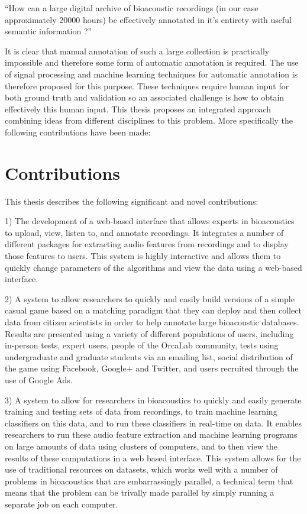 \documentclass[12pt,oneside]{book}
\begin{document}
``How can a large digital archive of bioacoustic recordings (in our
case approximately 20000 hours) be effectively annotated in it's
entirety with useful semantic information ?''

It is clear that manual annotation of such a large collection is
practically impossible and therefore some form of automatic annotation
is required. The use of signal processing and machine learning
techniques for automatic annotation is therefore proposed for this
purpose. These techniques require human input for both ground truth
and validation so an associated challenge is how to obtain effectively
this human input. This thesis proposes an integrated approach combining
ideas from different disciplines to this problem. More specifically
the following contributions have been made:

\section{Contributions}

This thesis describes the following significant and novel
contributions:

1) The development of a web-based interface that allows experts in
bioacoustics to upload, view, listen to, and annotate recordings.  It
integrates a number of different packages for extracting audio
features from recordings and to display those features to users.  This
system is highly interactive and allows them to quickly change
parameters of the algorithms and view the data using a web-based
interface.

2) A system to allow researchers to quickly and easily build versions
of a simple casual game based on a matching paradigm that they can
deploy and then collect data from citizen scientists in order to help
annotate large bioacoustic databases.  Results are presented using a
variety of different populations of users, including in-person tests,
expert users, people of the OrcaLab community, tests using
undergraduate and graduate students via an emailing list, social
distribution of the game using Facebook, Google+ and Twitter, and
users recruited through the use of Google Ads.

3) A system to allow for researchers in bioacoustics to quickly and
easily generate training and testing sets of data from recordings, to
train machine learning classifiers on this data, and to run these
classifiers in real-time on data.  It enables researchers to run these
audio feature extraction and machine learning programs on large
amounts of data using clusters of computers, and to then view the
results of these computations in a web based interface.  This system
allows for the use of traditional resources on datasets, which works
well with a number of problems in bioacoustics that are embarrassingly
parallel, a technical term that means that the problem can be trivally
made parallel by simply running a separate job on each computer.
\end{document}
